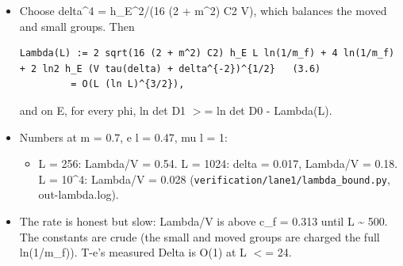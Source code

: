 \documentclass[11pt,a4paper]{article}
\begin{document}
\begin{itemize}
At m = 0.7 and small m\_f: tau \textasciitilde{} 14.0 + 17.6 ln(0.896/delta).
\item{} Choose delta\textasciicircum{}4 = h\_E\textasciicircum{}2/(16 (2 + m\textasciicircum{}2) C2 V), which balances the moved and small groups. Then
\begin{Verbatim}[breaklines=true,breakanywhere=true,fontsize=\small]
Lambda(L) := 2 sqrt(16 (2 + m^2) C2) h_E L ln(1/m_f) + 4 ln(1/m_f) + 2 ln2 h_E (V tau(delta) + delta^{-2})^{1/2}   (3.6)
         = O(L (ln L)^{3/2}),
\end{Verbatim}

and on E, for every phi, ln det D1 $>$= ln det D0 - Lambda(L).
\item{} Numbers at m = 0.7, e l = 0.47, mu l = 1:
\begin{itemize}
\item{} L = 256: Lambda/V = 0.54. L = 1024: delta = 0.017, Lambda/V = 0.18. L = 10\textasciicircum{}4: Lambda/V = 0.028
(\texttt{verification/\allowbreak{}lane1/\allowbreak{}lambda\_bound.py}, out-lambda.log).
\end{itemize}

\item{} The rate is honest but slow: Lambda/V is above c\_f = 0.313 until L \textasciitilde{} 500. The constants are crude (the small and moved
groups are charged the full ln(1/m\_f)). T-e's measured Delta is O(1) at L $<$= 24.
\end{itemize}
\end{document}
